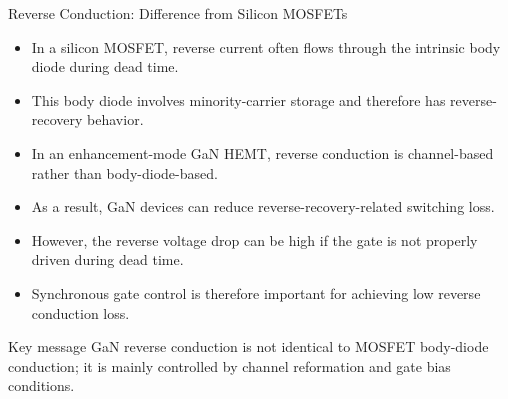 \begin{frame}{Reverse Conduction: Difference from Silicon MOSFETs}
\begin{itemize}
    \item In a silicon MOSFET, reverse current often flows through the intrinsic body diode during dead time.
    \item This body diode involves minority-carrier storage and therefore has reverse-recovery behavior.
    \item In an enhancement-mode GaN HEMT, reverse conduction is channel-based rather than body-diode-based.
    \item As a result, GaN devices can reduce reverse-recovery-related switching loss.
    \item However, the reverse voltage drop can be high if the gate is not properly driven during dead time.
    \item Synchronous gate control is therefore important for achieving low reverse conduction loss.
\end{itemize}

\begin{block}{Key message}
GaN reverse conduction is not identical to MOSFET body-diode conduction; it is mainly controlled by channel reformation and gate bias conditions.
\end{block}
\end{frame}


